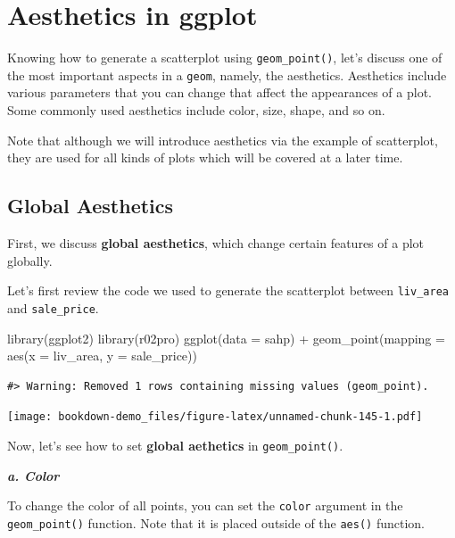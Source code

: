 \documentclass[
]{book}
\newenvironment{Shaded}{\begin{snugshade}}{\end{snugshade}}
\newcommand{\AttributeTok}[1]{\textcolor[rgb]{0.77,0.63,0.00}{#1}}
\newcommand{\FunctionTok}[1]{\textcolor[rgb]{0.00,0.00,0.00}{#1}}
\newcommand{\NormalTok}[1]{#1}
\newcommand{\SpecialCharTok}[1]{\textcolor[rgb]{0.00,0.00,0.00}{#1}}
\begin{document}
\hypertarget{aes}{%
\section{Aesthetics in ggplot}\label{aes}}

Knowing how to generate a scatterplot using \texttt{geom\_point()}, let's discuss one of the most important aspects in a \texttt{geom}, namely, the aesthetics. Aesthetics include various parameters that you can change that affect the appearances of a plot. Some commonly used aesthetics include color, size, shape, and so on.

Note that although we will introduce aesthetics via the example of scatterplot, they are used for all kinds of plots which will be covered at a later time.

\hypertarget{global-aes}{%
\subsection{Global Aesthetics}\label{global-aes}}

First, we discuss \textbf{global aesthetics}, which change certain features of a plot globally.

Let's first review the code we used to generate the scatterplot between \texttt{liv\_area} and \texttt{sale\_price}.

\begin{Shaded}
\begin{Highlighting}[]
\FunctionTok{library}\NormalTok{(ggplot2)}
\FunctionTok{library}\NormalTok{(r02pro)}
\FunctionTok{ggplot}\NormalTok{(}\AttributeTok{data =}\NormalTok{ sahp) }\SpecialCharTok{+} \FunctionTok{geom\_point}\NormalTok{(}\AttributeTok{mapping =} \FunctionTok{aes}\NormalTok{(}\AttributeTok{x =}\NormalTok{ liv\_area, }\AttributeTok{y =}\NormalTok{ sale\_price))}
\end{Highlighting}
\end{Shaded}

\begin{verbatim}
#> Warning: Removed 1 rows containing missing values (geom_point).
\end{verbatim}

\texttt{[image: bookdown-demo\_files/figure-latex/unnamed-chunk-145-1.pdf]}

Now, let's see how to set \textbf{global aethetics} in \texttt{geom\_point()}.

\textbf{\emph{a. Color}}

To change the color of all points, you can set the \texttt{color} argument in the \texttt{geom\_point()} function. Note that it is placed outside of the \texttt{aes()} function.
\end{document}
